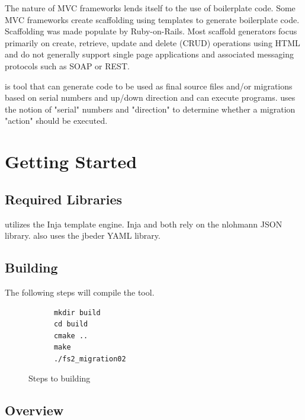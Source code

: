 \documentclass[]{article}
\begin{document}
The nature of MVC frameworks lends itself to the use of boilerplate code. Some MVC frameworks create scaffolding using templates to generate boilerplate code. Scaffolding was made populate by Ruby-on-Rails. Most scaffold generators focus primarily on create, retrieve, update and delete (CRUD) operations using HTML\cite{scaffold,vsscaffold} and do not generally support single page applications\cite{spa} and associated messaging protocols such as SOAP or REST.

 is tool that can generate code to be used as final source files and/or migrations based on serial numbers and up/down direction and can execute programs.  uses the notion of "serial" numbers and "direction" to determine whether a migration "action" should be executed.

\section{Getting Started}

\subsection{Required Libraries}
 utilizes the Inja\cite{inja} template engine. Inja and  both rely on the nlohmann JSON library\cite{nlohmann}.  also uses the jbeder YAML\cite{jbeder} library.

\subsection{Building }
The following steps will compile the  tool. 
\begin{figure}[H]
	\begin{lstlisting}
	  mkdir build
	  cd build
	  cmake ..
	  make
	  ./fs2_migration02
	\end{lstlisting}
	\caption{Steps to building}
\end{figure}

\subsection{Overview}
\end{document}
